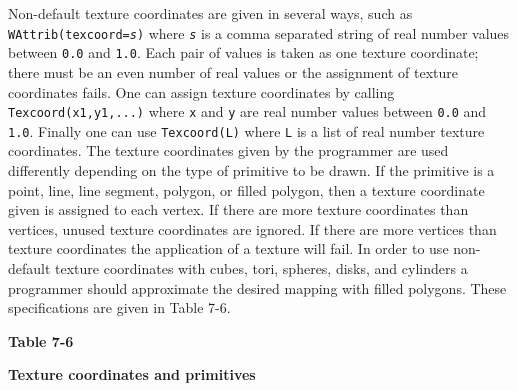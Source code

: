 Non-default texture coordinates are given in several ways, such as \linebreak
\texttt{WAttrib({\textquotedbl}texcoord=}\texttt{\textit{s{\textquotedbl}}}\texttt{)}
where \texttt{\textit{s}} is a comma separated string of real number
values between \texttt{0.0} and \texttt{1.0}. Each pair of values is
taken as one texture coordinate; there must be an even number of real
values or the assignment of texture coordinates fails. One
can assign texture coordinates by calling \texttt{Texcoord(x1,y1,...)}
where \texttt{x} and \texttt{y} are real number values between
\texttt{0.0} and \texttt{1.0}. Finally one can use \texttt{Texcoord(L)}
where \texttt{L} is a list of real number texture coordinates. The
texture coordinates given by the programmer are used differently
depending on the type of primitive to be drawn. If the primitive is a
point, line, line segment, polygon, or filled polygon, then a texture
coordinate given is assigned to each vertex. If there are more texture
coordinates than vertices, unused texture coordinates are ignored. If
there are more vertices than texture coordinates the application of a
texture will fail. In order to use non-default texture coordinates
with cubes, tori, spheres, disks, and cylinders a programmer should
approximate the desired mapping with filled polygons. These
specifications are given in Table 7-6.


{\centering\sffamily\bfseries
Table 7-6
\par}

{\centering\sffamily\bfseries
Texture coordinates and primitives
\par}

